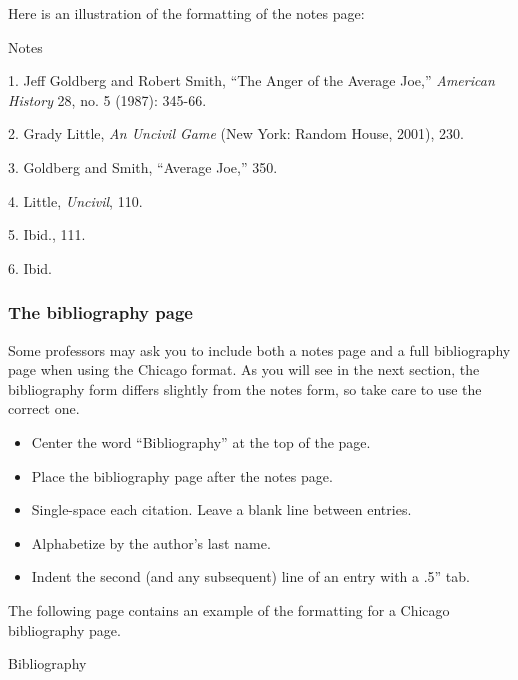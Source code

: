 \documentclass[12pt, hidelinks]{article} %
\newcommand{\tab}{\hspace*{2em}}
\begin{document}
Here is an illustration of the formatting of the notes page:
\newpage

\thispagestyle{empty}
\begin{center}Notes\end{center}
\smallskip

\tab 1. Jeff Goldberg and Robert Smith, ``The Anger of the Average Joe,'' \emph{American History} 28, no. 5 (1987): 345-66.
\smallskip

\tab 2. Grady Little, \emph{An Uncivil Game} (New York: Random House, 2001), 230.
\smallskip

\tab 3. Goldberg and Smith, ``Average Joe,'' 350.
\smallskip

\tab 4. Little, \emph{Uncivil}, 110.
\smallskip

\tab 5. Ibid., 111.
\smallskip

\tab 6. Ibid.

\newpage





\subsubsection{The bibliography page}
Some professors may ask you to include both a notes page and a full bibliography page when using the Chicago format. As you will see in the next section, the bibliography form differs slightly from the notes form, so take care to use the correct one.

\begin{itemize}
\item Center the word ``Bibliography'' at the top of the page.
\item Place the bibliography page after the notes page.
\item Single-space each citation. Leave a blank line between entries.
\item Alphabetize by the author's last name.
\item Indent the second (and any subsequent) line of an entry with a .5'' tab.
\end{itemize}

The following page contains an example of the formatting for a Chicago bibliography page.
\newpage





\thispagestyle{empty}
\begin{center}Bibliography\end{center}
\end{document}
